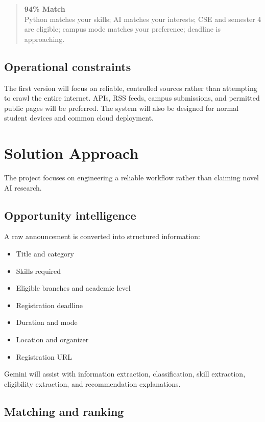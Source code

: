 \documentclass[11pt,a4paper]{article}
\begin{document}
\begin{quote}
\textbf{94\% Match}\\
Python matches your skills; AI matches your interests; CSE and semester 4 are eligible; campus mode matches your preference; deadline is approaching.
\end{quote}

\subsection{Operational constraints}

The first version will focus on reliable, controlled sources rather than attempting to crawl the entire internet. APIs, RSS feeds, campus submissions, and permitted public pages will be preferred. The system will also be designed for normal student devices and common cloud deployment.

\section{Solution Approach}

The project focuses on engineering a reliable workflow rather than claiming novel AI research.

\subsection{Opportunity intelligence}

A raw announcement is converted into structured information:

\begin{itemize}
\item Title and category
\item Skills required
\item Eligible branches and academic level
\item Registration deadline
\item Duration and mode
\item Location and organizer
\item Registration URL
\end{itemize}

Gemini will assist with information extraction, classification, skill extraction, eligibility extraction, and recommendation explanations.

\subsection{Matching and ranking}
\end{document}
